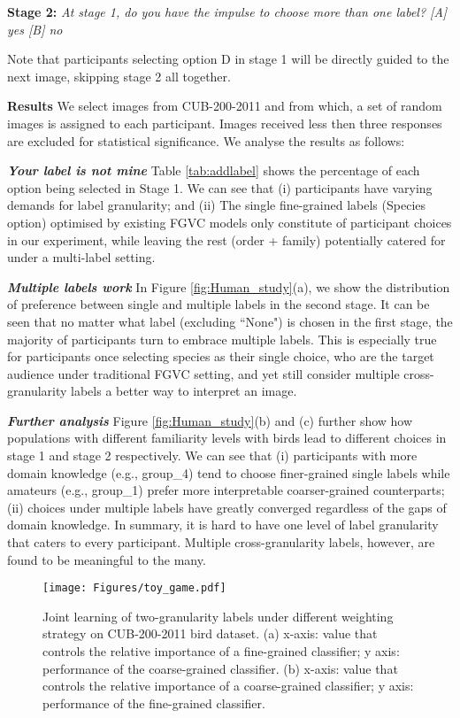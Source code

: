 \documentclass[final]{cvpr}
\newcommand{\keypoint}[1]{\vspace{0.05cm}\noindent\textbf{#1}\quad}
\begin{document}
\noindent\textbf{Stage 2:} \textit{At stage 1, do you have the impulse to choose more than one label? [A] yes [B] no}

\noindent Note that participants selecting option D in stage 1 will be directly guided to the next image, skipping stage 2 all together. 


\keypoint{Results} We select  images from CUB-200-2011 and from which, a set of random  images is assigned to each participant. Images received less then three responses are excluded for statistical significance. We analyse the results as follows:


\keypoint{\textit{Your label is not mine}} Table \ref{tab:addlabel} shows the percentage of each option being selected in Stage 1. We can see that (i) participants have varying demands for label granularity; and (ii) The single fine-grained labels (Species option) optimised by existing FGVC models only constitute  of participant choices in our experiment, while leaving the rest  (order + family) potentially catered for under a multi-label setting.



\keypoint{\textit{Multiple labels work}} In Figure \ref{fig:Human_study}(a), we show the distribution of preference between single and multiple labels in the second stage. It can be seen that no matter what label (excluding ``None") is chosen in the first stage, the majority of participants turn to embrace multiple labels. This is especially true for participants once selecting species as their single choice, who are the target audience under traditional FGVC setting, and yet still consider multiple cross-granularity labels a better way to interpret an image. 



\keypoint{\textit{Further analysis}} Figure \ref{fig:Human_study}(b) and (c) further show how populations with different familiarity levels with birds lead to different choices in stage 1 and stage 2 respectively. We can see that (i) participants with more domain knowledge (e.g., group\_4) tend to choose finer-grained single labels while amateurs (e.g., group\_1) prefer more interpretable coarser-grained counterparts; (ii) choices under multiple labels have greatly converged regardless of the gaps of domain knowledge. In summary, it is hard to have one level of label granularity that caters to every participant. Multiple cross-granularity labels, however, are found to be meaningful to the many.

\begin{figure*}[t]
\begin{center}
\texttt{[image: Figures/toy\_game.pdf]}
\end{center}

  \caption{Joint learning of two-granularity labels under different weighting strategy on CUB-200-2011 bird dataset. (a) x-axis:  value that controls the relative importance of a fine-grained classifier; y axis: performance of the coarse-grained classifier. (b) x-axis:  value that controls the relative importance of a coarse-grained classifier; y axis: performance of the fine-grained classifier.}

\label{fig:toy_game}
\end{figure*}
\end{document}
